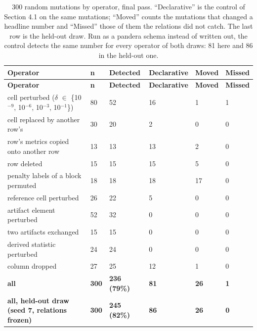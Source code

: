 \documentclass[acmsmall,screen,review]{acmart}
\begin{document}
\begingroup
\small
\setlength\LTleft{\fill}
\setlength\LTright{\fill}
\begin{xltabular}{\textwidth}{Ylllll}
\caption{300 random mutations by operator, final pass. ``Declarative'' is the control of Section 4.1 on the same mutations; ``Moved'' counts the mutations that changed a headline number and ``Missed'' those of them the relations did not catch. The last row is the held-out draw. Run as a pandera schema instead of written out, the control detects the same number for every operator of both draws: 81 here and 86 in the held-out one.}\label{tab:4} \\
\toprule
\textbf{Operator} & \textbf{n} & \textbf{Detected} & \textbf{Declarative} & \textbf{Moved} & \textbf{Missed} \\
\midrule
\endfirsthead
\toprule
\textbf{Operator} & \textbf{n} & \textbf{Detected} & \textbf{Declarative} & \textbf{Moved} & \textbf{Missed} \\
\midrule
\endhead
\endfoot
\bottomrule
\endlastfoot
cell perturbed ($\delta$ $\in$ \{10$^{-9}$, 10$^{-6}$, 10$^{-3}$, 10$^{-1}$\}) & 80 & 52 & 16 & 1 & 1 \\*
cell replaced by another row's & 30 & 20 & 2 & 0 & 0 \\*
row's metrics copied onto another row & 13 & 13 & 13 & 2 & 0 \\*
row deleted & 15 & 15 & 15 & 5 & 0 \\*
penalty labels of a block permuted & 18 & 18 & 18 & 17 & 0 \\*
reference cell perturbed & 26 & 22 & 5 & 0 & 0 \\*
artifact element perturbed & 52 & 32 & 0 & 0 & 0 \\*
two artifacts exchanged & 15 & 15 & 0 & 0 & 0 \\*
derived statistic perturbed & 24 & 24 & 0 & 0 & 0 \\*
column dropped & 27 & 25 & 12 & 1 & 0 \\*
\textbf{all} & \textbf{300} & \textbf{236 (79\%)} & \textbf{81} & \textbf{26} & \textbf{1} \\*
\textbf{all, held-out draw (seed 7, relations frozen)} & \textbf{300} & \textbf{245 (82\%)} & \textbf{86} & \textbf{26} & \textbf{0} \\
\end{xltabular}
\endgroup
\end{document}
